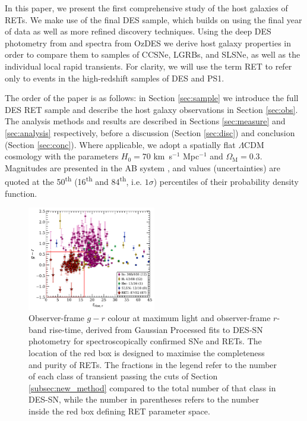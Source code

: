 \documentclass[fleqn,usenatbib,]{mnras}
\begin{document}
In this paper, we present the first comprehensive study of the host galaxies of RETs. We make use of the final DES sample, which builds on  using the final year of data as well as more refined discovery techniques. Using the deep DES photometry from \citet[hereafter W20]{Wiseman2020} and spectra from OzDES \citep{Lidman2020} we derive host galaxy properties in order to compare them to samples of CCSNe, LGRBs, and SLSNe, as well as the individual local rapid transients. For clarity, we will use the term RET to refer only to events in the high-redshift samples of DES and PS1. 

The order of the paper is as follows: in Section \ref{sec:sample} we introduce the full DES RET sample and describe the host galaxy observations in Section \ref{sec:obs}. The analysis methods and results are described in Sections \ref{sec:measure} and \ref{sec:analysis} respectively, before a discussion (Section \ref{sec:disc}) and conclusion (Section \ref{sec:conc}).
Where applicable, we adopt a spatially flat $\Lambda$CDM cosmology with the parameters $H_0=70$ km~s$^{-1}$ Mpc$^{-1}$ and $\Omega_{\textrm{M}}=0.3$. Magnitudes are presented in the AB system \citep{Oke1983}, and values (uncertainties) are quoted at the 50\textsuperscript{th} (16\textsuperscript{th} and 84\textsuperscript{th}, i.e. $1\sigma$) percentiles of their probability density function.

\begin{figure}
\includegraphics[width=0.5\textwidth]{figs/spec_gr_trise_r_GP5_new_colorscheme.pdf}
\caption{Observer-frame $g-r$ colour at maximum light and observer-frame $r$-band rise-time, derived from Gaussian Processed fits to DES-SN photometry for spectroscopically confirmed SNe and  RETs. The location of the red box is designed to maximise the completeness and purity of RETs. The fractions in the legend refer to the number of each class of transient passing the cuts of Section \ref{subsec:new_method} compared to the total number of that class in DES-SN, while the number in parentheses refers to the number inside the red box defining RET parameter space. 
\label{fig:selection}}
\end{figure}
\end{document}
